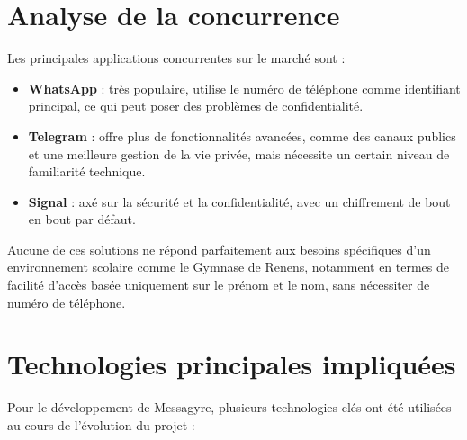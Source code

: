 \documentclass[12pt]{report}
\begin{document}
\section{Analyse de la concurrence}

Les principales applications concurrentes sur le marché sont :

\begin{itemize}
	\item \textbf{WhatsApp} : très populaire, utilise le numéro de téléphone comme identifiant principal, ce qui peut poser des problèmes de confidentialité.
	\item \textbf{Telegram} : offre plus de fonctionnalités avancées, comme des canaux publics et une meilleure gestion de la vie privée, mais nécessite un certain niveau de familiarité technique.
	\item \textbf{Signal} : axé sur la sécurité et la confidentialité, avec un chiffrement de bout en bout par défaut.
\end{itemize}

Aucune de ces solutions ne répond parfaitement aux besoins spécifiques d’un environnement scolaire comme le Gymnase de Renens, notamment en termes de facilité d’accès basée uniquement sur le prénom et le nom, sans nécessiter de numéro de téléphone.

\section{Technologies principales impliquées}

Pour le développement de Messagyre, plusieurs technologies clés ont été utilisées au cours de l’évolution du projet :
\end{document}
